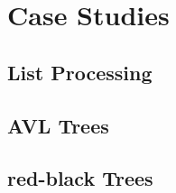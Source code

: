 
\section{Case Studies}
\label{sec:case-studies}

\subsection{List Processing}
\subsection{AVL Trees}
\subsection{red-black Trees}



